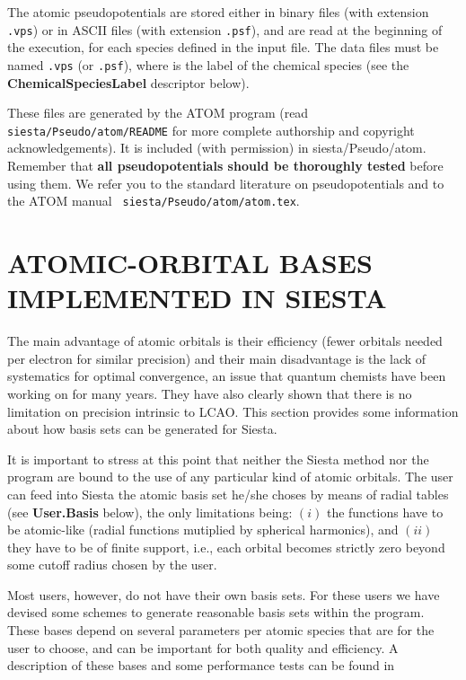 \documentclass[11pt]{article}
\begin{document}
The atomic pseudopotentials are stored either in binary files (with
extension {\tt .vps}) or in ASCII files (with extension {\tt .psf}),
and are read at the beginning of the execution, for each species
defined in the input file. The data files must be named {\tt *.vps}
(or {\tt *.psf}), where {\tt *} is the label of the chemical species
(see the {\bf ChemicalSpeciesLabel} descriptor below).

These files are generated by the ATOM program (read {\tt
siesta/Pseudo/atom/README} for more complete authorship and copyright
acknowledgements).  It is included (with permission) in
siesta/Pseudo/atom. Remember that {\bf all pseudopotentials should be
thoroughly tested} before using them. We refer you to the standard
literature on pseudopotentials and to the {\sc ATOM} manual {\tt
siesta/Pseudo/atom/atom.tex}.


\section{ATOMIC-ORBITAL BASES IMPLEMENTED IN SIESTA}

The main advantage of atomic orbitals is their efficiency (fewer orbitals 
needed per electron for similar precision) 
and their main disadvantage is the lack of systematics for optimal 
convergence, an issue that quantum chemists have been working on for
many years. They have also clearly shown that there
is no limitation on precision intrinsic to LCAO.
This section provides some information about how basis sets can be
generated for {\sc Siesta}.

It is important to stress at this point that neither the {\sc Siesta} 
method nor the program
are bound to the use of any particular kind of atomic orbitals. The
user can feed into {\sc Siesta} the atomic basis set he/she choses by
means of radial tables (see {\bf User.Basis} below), the
only limitations being: $(i)$ the functions have to be atomic-like (radial 
functions mutiplied by spherical harmonics), and $(ii)$ they have to be
of finite support, i.e., each orbital becomes strictly zero beyond some
cutoff radius chosen by the user.

Most users, however, do not have their own basis sets. For these users
we have devised some schemes to generate reasonable basis sets within
the program. These bases depend on several parameters per atomic
species that are for the user to choose, and can be important for both
quality and efficiency. A description of these bases and some
performance tests can be found in
\end{document}
